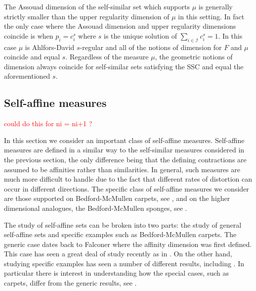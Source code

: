 The Assouad dimension of the self-similar set which supports $\mu$ is generally strictly smaller than the upper regularity dimension of $\mu$ in this setting.  In fact the only case where the Assouad dimension and upper regularity dimensions coincide is when  $p_i=c_i^s$ where $s$ is the unique solution of $\sum_{i \in \mathcal{I}} c_i^s = 1$.   In this case $\mu$ is Ahlfors-David $s$-regular and all of the notions of dimension for $F$ and $\mu$ coincide and equal $s$. Regardless of the measure $\mu$, the geometric notions of dimension always coincide for self-similar sets satisfying the SSC and equal the aforementioned $s$. 













\subsection{Self-affine measures}\label{ch-upper-reg:self-affineresults}

\textcolor{red}{could do this for ni = ni+1 ?}

In this section we consider an important class of self-affine measures.  Self-affine measures are defined in a similar way to the self-similar measures considered in the previous section, the only difference being that the defining contractions are assumed to be affinities rather than similarities.  In general, such measures are much more difficult to handle due to the fact that different rates of distortion can occur in different directions.  The specific class of self-affine measures we consider are those supported on Bedford-McMullen carpets, see \cite{bedford, mcmullen}, and on the higher dimensional analogues, the Bedford-McMullen sponges, see \cite{kenyonperes, sponges}. 

The study of self-affine sets can be broken into two parts: the study of general self-affine sets and specific examples such as Bedford-McMullen carpets. The generic case dates back to Falconer \cite{falconer-affine} where the affinity dimension was first defined. This case has seen a great deal of study recently as in \cite{barany-hochman-rapaport, etc}. On the other hand, studying specific examples has seen a number of different results, including \cite{bedford,mcmullen, lalley-gatzouras, baranski, mackay}. In particular there is interest in understanding how the special cases, such as carpets, differ from the generic results, see \cite{ianmorris, et al}. 


